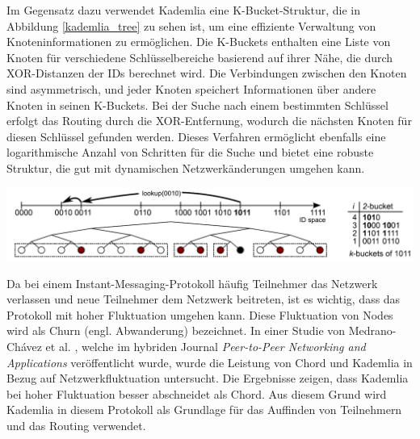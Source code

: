 \noindent Im Gegensatz dazu verwendet Kademlia eine K-Bucket-Struktur, die in Abbildung \ref{kademlia_tree} zu sehen ist, um eine effiziente Verwaltung von Knoteninformationen zu ermöglichen. Die K-Buckets enthalten eine Liste von Knoten für verschiedene Schlüsselbereiche basierend auf ihrer Nähe, die durch XOR-Distanzen der IDs berechnet wird. Die Verbindungen zwischen den Knoten sind asymmetrisch, und jeder Knoten speichert Informationen über andere Knoten in seinen K-Buckets. Bei der Suche nach einem bestimmten Schlüssel erfolgt das Routing durch die XOR-Entfernung, wodurch die nächsten Knoten für diesen Schlüssel gefunden werden. Dieses Verfahren ermöglicht ebenfalls eine logarithmische Anzahl von Schritten für die Suche und bietet eine robuste Struktur, die gut mit dynamischen Netzwerkänderungen umgehen kann.

\begin{center}
    \captionsetup{type=figure}
    \includegraphics[width=0.9\linewidth]{images/kademlia_tree.png}
    \label{kademlia_tree}
\end{center}


\noindent Da bei einem Instant-Messaging-Protokoll häufig Teilnehmer das Netzwerk verlassen und neue Teilnehmer dem Netzwerk beitreten, ist es wichtig, dass das Protokoll mit hoher Fluktuation umgehen kann. Diese Fluktuation von Nodes wird als Churn (engl. Abwanderung) bezeichnet. In einer Studie von Medrano-Chávez et al. \parencite{MedranoChavez_ChordKademliaHighChurnScenarios}, welche im hybriden Journal \textit{Peer-to-Peer Networking and Applications} veröffentlicht wurde, wurde die Leistung von Chord und Kademlia in Bezug auf Netzwerkfluktuation untersucht. Die Ergebnisse zeigen, dass Kademlia bei hoher Fluktuation besser abschneidet als Chord. Aus diesem Grund wird Kademlia in diesem Protokoll als Grundlage für das Auffinden von Teilnehmern und das Routing verwendet.



